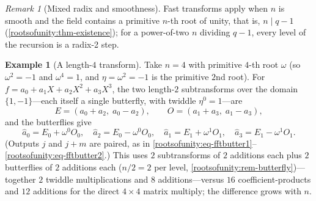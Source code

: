 \documentclass[11pt,a4paper]{article}
\theoremstyle{definition}
\newtheorem{example}[theorem]{Example}
\theoremstyle{remark}
\newtheorem{remark}[theorem]{Remark}
\begin{document}
\begin{remark}[Mixed radix and smoothness]\label{rootsofunity:rem-mixedradix}
Fast transforms apply when \(n\) is smooth and the field contains a
primitive \(n\)-th root of unity, that is, \(n \mid q - 1\)
(\cref{rootsofunity:thm-existence}); for a power-of-two \(n\) dividing
\(q - 1\), every level of the recursion is a radix-2 step.
\end{remark}

\begin{example}[A length-\(4\) transform]\label{rootsofunity:exp-fft4}
Take \(n = 4\) with primitive \(4\)-th root \(\omega\) (so
\(\omega^2 = -1\) and \(\omega^4 = 1\), and \(\eta = \omega^2 = -1\) is
the primitive \(2\)nd root). For
\(f = a_0 + a_1 X + a_2 X^2 + a_3 X^3\), the two length-\(2\)
subtransforms over the domain \(\{1, -1\}\)---each itself a single
butterfly, with twiddle \(\eta^0 = 1\)---are
\[
E = (a_0 + a_2,\; a_0 - a_2),
\qquad
O = (a_1 + a_3,\; a_1 - a_3),
\]
and the butterflies give
\[
\hat{a}_0 = E_0 + \omega^0 O_0, \quad
\hat{a}_2 = E_0 - \omega^0 O_0, \quad
\hat{a}_1 = E_1 + \omega^1 O_1, \quad
\hat{a}_3 = E_1 - \omega^1 O_1.
\]
(Outputs \(j\) and \(j + m\) are paired, as in
\eqref{rootsofunity:eq-fftbutter1}--\eqref{rootsofunity:eq-fftbutter2}.)
This uses \(2\) subtransforms of \(2\) additions each plus \(2\)
butterflies of \(2\) additions each (\(n/2 = 2\) per level,
\cref{rootsofunity:rem-butterfly})---together \(2\) twiddle
multiplications and \(8\) additions---versus \(16\) coefficient-products
and \(12\) additions for the direct \(4 \times 4\) matrix multiply; the
difference grows with \(n\).
\end{example}
\end{document}
